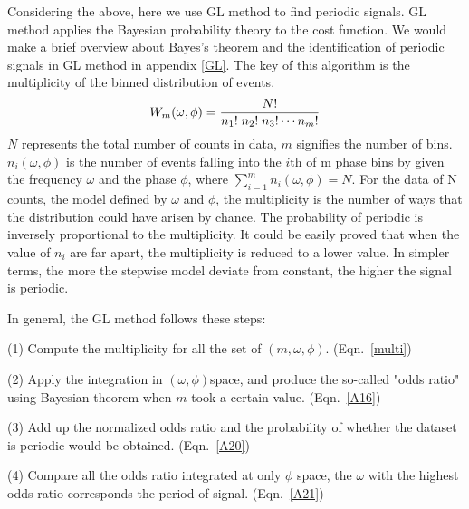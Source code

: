 \documentclass[twoside,twocolumn]{aastex63}
\begin{document}
Considering the above, here we use GL method to find periodic signals. GL method applies the Bayesian probability theory to the cost function. We would make a brief overview about Bayes's theorem and the identification of periodic signals in GL method in appendix \ref{GL}. The key of this algorithm is the multiplicity of the binned distribution of events. 
\begin{equation}\label{multi}
W_m(\omega, \phi)={{N!}\over{n_1!\; n_2!\; n_3!\cdots {n_m}!}}
\end{equation}
$N$ represents the total number of counts in data, $m$ signifies the number of bins. $n_i(\omega, \phi)$ is the number of events falling into the $i$th of m phase bins by given the frequency $\omega$ and the phase $\phi$, where $\sum\limits_{i=1}^{m}n_i(\omega, \phi)=N$. For the data of N counts, the model defined by $\omega$ and $\phi$, the multiplicity is the number of ways that the distribution could have arisen by chance. The probability of periodic is inversely proportional to the multiplicity. It could be easily proved that when the value of $n_i$ are far apart, the multiplicity is reduced to a lower value. In simpler terms, the more the stepwise model deviate from constant, the higher the signal is periodic. 

In general, the GL method follows these steps:

(1) Compute the multiplicity for all the set of $(m,\omega, \phi)$. (Eqn.~\ref{multi})

(2) Apply the integration in $(\omega, \phi)$space, and produce the so-called "odds ratio" using Bayesian theorem when $m$ took a certain value. (Eqn.~\ref{A16})

(3) Add up the normalized odds ratio and the probability of whether the dataset is periodic would be obtained. (Eqn.~\ref{A20})

(4) Compare all the odds ratio integrated at only $\phi$ space, the $\omega$ with the highest odds ratio corresponds the period of signal. (Eqn.~\ref{A21})

\end{document}
